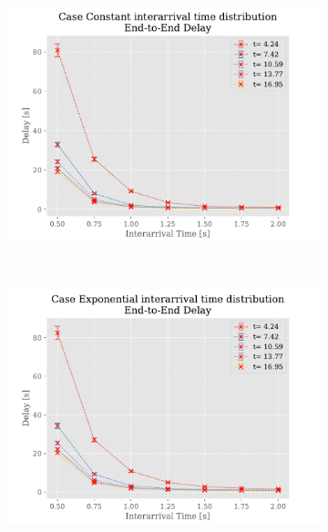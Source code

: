 \documentclass[a4paper,12pt]{article}
\begin{document}
\begin{figure}
  \centering
  \begin{subfigure}[b]{.45\textwidth}
    \includegraphics[width=\textwidth]{img/DelayP2Const.pdf}
    \label{fig:exp:const:delay}
  \end{subfigure}
  ~
  \begin{subfigure}[b]{.45\textwidth}
    \includegraphics[width=\textwidth]{img/DelayP2Exp.pdf}
    \label{fig:exp:exp:delay}
  \end{subfigure}
  \\
  \begin{subfigure}[b]{.45\textwidth}

\end{subfigure}
\end{figure}
\end{document}
